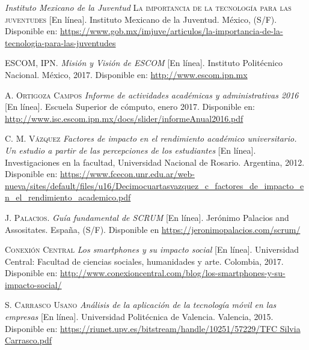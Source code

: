 \begin{thebibliography}{X}
		\textit{Instituto Mexicano de la Juventud}
		\textsc{La importancia de la tecnología para las juventudes} [En línea].
		Instituto Mexicano de la Juventud. México, (S/F). 
		\newline
		Disponible en: 
		\url{https://www.gob.mx/imjuve/articulos/la-importancia-de-la-tecnologia-para-las-juventudes}	

		\textsc{ESCOM, IPN.}
		\textit{Misión y Visión de ESCOM} [En línea].
		Instituto Politécnico Nacional. México, 2017. 
		\newline
		Disponible en:
		\url{http://www.escom.ipn.mx}

		\textsc{A. Ortigoza Campos}
		\textit{Informe de actividades académicas y administrativas 2016} [En línea]. 
		Escuela Superior de cómputo, enero 2017. 
		\newline
		Disponible en:
		\url{http://www.isc.escom.ipn.mx/docs/slider/informeAnual2016.pdf}

		\textsc{C. M. Vázquez}
		\textit{Factores de impacto en el rendimiento académico universitario. Un estudio a
		partir de las percepciones de los estudiantes} [En línea].
		Investigaciones en la facultad, Universidad Nacional de Rosario. Argentina, 2012. 
		\newline
		Disponible en:
		\url{https://www.fcecon.unr.edu.ar/web-nueva/sites/default/files/u16/Decimocuartasvazquez_c_factores_de_impacto_en_el_rendimiento_academico.pdf}

		\textsc{J. Palacios.}
		\textit{Guía fundamental de SCRUM} [En línea].
		Jerónimo Palacios and Assositates. España, (S/F). 
		\newline
		Disponible en 
		\url{https://jeronimopalacios.com/scrum/}

		\textsc{Conexión Central}
		\textit{Los smartphones y su impacto social} [En línea]. 
		Universidad Central: Facultad de ciencias sociales, humanidades y arte. Colombia, 2017. 
		\newline
		Disponible en:
		\url{http://www.conexioncentral.com/blog/los-smartphones-y-su-impacto-social/}

		\textsc{S. Carrasco Usano}
		\textit{Análisis de la aplicación de la tecnología móvil en las empresas} [En línea]. 
		Universidad Politécnica de Valencia. Valencia, 2015. 
		\newline
		Disponible en:
		\url{https://riunet.upv.es/bitstream/handle/10251/57229/TFC Silvia Carrasco.pdf}
	

\end{thebibliography}
